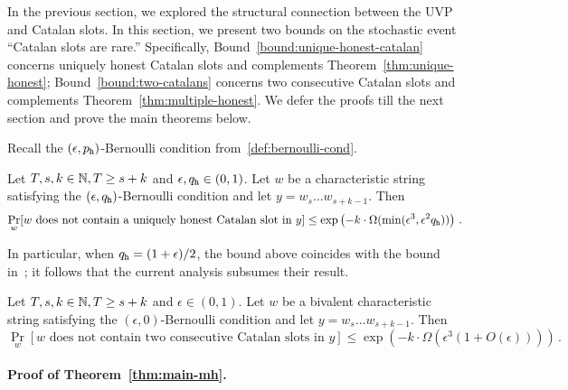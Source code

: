 
In the previous section, 
we explored the structural connection 
between the UVP and Catalan slots. 
In this section, we present two bounds 
on the stochastic event ``Catalan slots are rare.'' 
Specifically,
Bound~\ref{bound:unique-honest-catalan} 
concerns uniquely honest Catalan slots and complements Theorem~\ref{thm:unique-honest}; 
Bound~\ref{bound:two-catalans} concerns 
two consecutive Catalan slots and complements Theorem~\ref{thm:multiple-honest}. 
We defer the proofs till the next section 
and prove the main theorems below.



Recall the $(\epsilon, p_{\mathtt{h}})$-Bernoulli condition 
from~\ref{def:bernoulli-cond}.
\begin{bound}\label{bound:unique-honest-catalan}
  Let $T, s, k \in \mathbb{N}, T \geq s + k$ and  $\epsilon, q_{\mathtt{h}} \in (0, 1)$. 
  Let $w$ be a characteristic string satisfying 
  the $(\epsilon, q_{\mathtt{h}})$-Bernoulli condition 
  and let $y = w_s \ldots w_{s+k-1}$.
  Then 
  \[
    \Pr_w[\text{$w$ does not contain a uniquely honest Catalan slot in $y$}]  
      \leq 
      \exp\left(
        -k\cdot \Omega(\min(\epsilon^3, \epsilon^2 q_{\mathtt{h}})) 
      \right)
      \,.
  \]
\end{bound}
In particular, 
when $q_{\mathtt{h}} = (1+\epsilon)/2$, 
the bound above coincides with the 
bound in~\cite{LinearConsistency}; 
it follows that the current analysis 
subsumes their result.




\begin{bound}\label{bound:two-catalans}
  Let $T, s, k \in \mathbb{N}, T \geq s + k$ and  $\epsilon \in (0, 1)$. 
  Let $w$ be a bivalent characteristic string satisfying 
  the $(\epsilon, 0)$-Bernoulli condition 
  and let $y = w_s \ldots w_{s+k-1}$.
  Then 
  \[
    \Pr_w[\text{$w$ does not contain two consecutive Catalan slots in $y$}]  
      \leq 
      \exp\left(
        - k\cdot \Omega(\epsilon^3(1 + O(\epsilon))) 
      \right)
      \,.
  \]
\end{bound}





\paragraph{Proof of Theorem~\ref{thm:main-mh}.}

